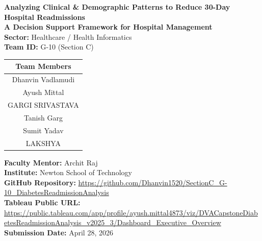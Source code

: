 \documentclass[12pt,a4paper]{article}
\begin{document}
\begin{titlepage}
    \centering
    \vspace*{2cm}
    
    {\Huge \textbf{Analyzing Clinical \& Demographic Patterns to Reduce 30-Day Hospital Readmissions}} \\
    \vspace{1cm}
    {\Large \textbf{A Decision Support Framework for Hospital Management}} \\
    
    \vspace{1cm}
    \textbf{Sector:} Healthcare / Health Informatics \\
    \textbf{Team ID:} G-10 (Section C) \\
    
    \vspace{0.5cm}
    \begin{table}[h]
        \centering
        \begin{tabular}{c}
            \textbf{Team Members} \\
            \midrule
            Dhanvin Vadlamudi \\
            Ayush Mittal \\
            GARGI SRIVASTAVA \\
            Tanish Garg \\
            Sumit Yadav \\
            LAKSHYA \\
        \end{tabular}
    \end{table}

    \vspace{0.5cm}
    \textbf{Faculty Mentor:} Archit Raj \\
    \textbf{Institute:} Newton School of Technology \\
    
    \vspace{1cm}
    \textbf{GitHub Repository:} \href{https://github.com/Dhanvin1520/SectionC_G-10_DiabetesReadmissionAnalysis}{https://github.com/Dhanvin1520/SectionC\_G-10\_DiabetesReadmissionAnalysis} \\
    \textbf{Tableau Public URL:} \href{https://public.tableau.com/app/profile/ayush.mittal4873/viz/DVACapstoneDiabetesReadmissionAnalysis_v2025_3/Dashboard_Executive_Overview?publish=yes}{https://public.tableau.com/app/profile/ayush.mittal4873/viz/DVACapstoneDiabetesReadmissionAnalysis\_v2025\_3/Dashboard\_Executive\_Overview} \\
    
    \vfill
    \textbf{Submission Date:} April 28, 2026
\end{titlepage}
\end{document}
